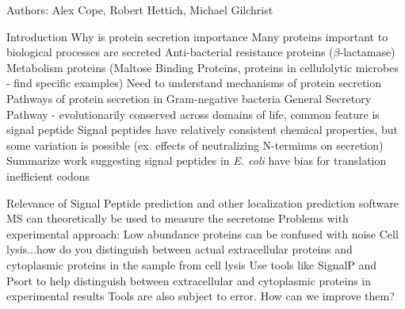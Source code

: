 \documentclass[11pt]{labbook}
\begin{document}
Authors: Alex Cope, Robert Hettich, Michael Gilchrist
\begin{outline}[enumerate]
\1 Introduction
	\2 Why is protein secretion importance
		\3 Many proteins important to biological processes are secreted
			\4 Anti-bacterial resistance proteins ($\beta$-lactamase)
			\4 Metabolism proteins (Maltose Binding Proteins, proteins in cellulolytic microbes - find specific examples)
			\4 Need to understand mechanisms of protein secretion
		\3 Pathways of protein secretion in Gram-negative bacteria
			\4 General Secretory Pathway - evolutionarily conserved across domains of life, common feature is signal peptide
			\4 Signal peptides have relatively consistent chemical properties, but some variation is possible (ex. effects of neutralizing N-terminus on secretion)
			\4 Summarize work suggesting signal peptides in \textit{E. coli} have bias for translation inefficient codons
			
	\2 Relevance of Signal Peptide prediction and other localization prediction software
		\3 MS can theoretically be used to measure the secretome
		\3 Problems with experimental approach: 
			\4 Low abundance proteins can be confused with noise
			\4 Cell lysis...how do you distinguish between actual extracellular proteins and cytoplasmic proteins in the sample from cell lysis
		\3 Use tools like SignalP and Psort to help distinguish between extracellular and cytoplasmic proteins in experimental results
			\4 Tools are also subject to error. How can we improve them? 
		

\end{outline}
\end{document}
